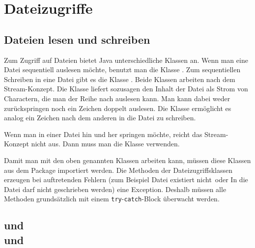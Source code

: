 \chapter{Dateizugriffe}
\renewcommand{\chaptertitle}{Dateizugriffe}

\lehead[]{\sf\hspace*{-2.00cm}\textcolor{white}{\colorbox{lightblue}{\makebox[1.60cm][r]{\thechapter}}}\hspace{0.17cm}\textcolor{lightblue}{\chaptertitle}}
\rohead[]{\textcolor{lightblue}{\chaptertitle}\sf\hspace*{0.17cm}\textcolor{white}{\colorbox{lightblue}{\makebox[1.60cm][l]{\thechapter}}}\hspace{-2.00cm}}
\rehead[]{\textcolor{lightblue}{AvHG, Inf, My}}
\lohead[]{\textcolor{lightblue}{AvHG, Inf, My}}

\lstset{style=myJava}

\section{Dateien lesen und schreiben}

Zum Zugriff auf Dateien bietet Java unterschiedliche Klassen an. Wenn man eine
Datei sequentiell auslesen möchte, benutzt man die Klasse
. Zum sequentiellen Schreiben in eine Datei gibt es die
Klasse . Beide Klassen arbeiten nach dem
Stream-Konzept. Die Klasse  liefert sozusagen den
Inhalt der Datei als Strom von Charactern, die man der Reihe nach auslesen
kann. Man kann dabei weder zurückspringen noch ein Zeichen doppelt auslesen.
Die Klasse  ermöglicht es analog ein Zeichen nach dem
anderen in die Datei zu schreiben.

Wenn man in einer Datei hin und her springen möchte, reicht das Stream-Konzept
nicht aus. Dann muss man die Klasse  verwenden.

Damit man mit den oben genannten Klassen arbeiten kann, müssen diese Klassen
aus dem Package  importiert werden. Die Methoden der
Dateizugriffsklassen erzeugen bei auftretenden Fehlern (zum Beispiel \glqq Datei
existiert nicht\grqq\ oder \glqq In die Datei darf nicht geschrieben
werden\grqq ) eine Exception. Deshalb müssen alle Methoden grundsätzlich mit
einem \lstinline|try|-\lstinline|catch|-Block überwacht werden.


\section{ und \\
 und }

